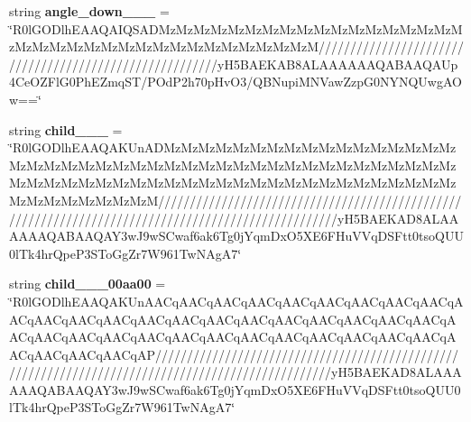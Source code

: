 \begin{DoxyCompactItemize}
\item 
\mbox{\label{class_c_utils_1_1_utils_1_1_resources_1_1_icons_a978c4593cf1b4977e728f768bfef80ed}} 
string {\bfseries angle\+\_\+down\+\_\+\_\+\_} = \char`\"{}R0l\+G\+O\+Dlh\+E\+A\+A\+Q\+A\+I\+Q\+S\+A\+D\+Mz\+Mz\+Mz\+Mz\+Mz\+Mz\+Mz\+Mz\+Mz\+Mz\+Mz\+Mz\+Mz\+Mz\+Mz\+Mz\+Mz\+Mz\+Mz\+Mz\+Mz\+Mz\+Mz\+Mz\+Mz\+Mz\+Mz\+Mz\+Mz\+Mz\+Mz\+Mz\+Mz\+Mz\+MzM////////////////////////////////////////////////////////y\+H5\+B\+A\+E\+K\+A\+B8\+A\+L\+A\+A\+A\+A\+A\+A\+Q\+A\+B\+A\+A\+Q\+A\+Up4\+Ce\+O\+Z\+Fl\+G0\+Ph\+E\+Zmq\+ST/P\+Od\+P2h70p\+Hv\+O3/Q\+B\+Nupi\+M\+N\+Vaw\+Zzp\+G0\+N\+Y\+N\+Q\+Uwg\+A\+Ow==\char`\"{}
\item 
\mbox{\label{class_c_utils_1_1_utils_1_1_resources_1_1_icons_a7312b130476c6556ab1cd6ba6aea9ccc}} 
string {\bfseries child\+\_\+\_\+\_} = \char`\"{}R0l\+G\+O\+Dlh\+E\+A\+A\+Q\+A\+K\+Un\+A\+D\+Mz\+Mz\+Mz\+Mz\+Mz\+Mz\+Mz\+Mz\+Mz\+Mz\+Mz\+Mz\+Mz\+Mz\+Mz\+Mz\+Mz\+Mz\+Mz\+Mz\+Mz\+Mz\+Mz\+Mz\+Mz\+Mz\+Mz\+Mz\+Mz\+Mz\+Mz\+Mz\+Mz\+Mz\+Mz\+Mz\+Mz\+Mz\+Mz\+Mz\+Mz\+Mz\+Mz\+Mz\+Mz\+Mz\+Mz\+Mz\+Mz\+Mz\+Mz\+Mz\+Mz\+Mz\+Mz\+Mz\+Mz\+Mz\+Mz\+Mz\+Mz\+Mz\+Mz\+Mz\+Mz\+Mz\+Mz\+Mz\+Mz\+Mz\+Mz\+Mz\+Mz\+Mz\+Mz\+Mz\+MzM////////////////////////////////////////////////////////////////////////////////////////////////////y\+H5\+B\+A\+E\+K\+A\+D8\+A\+L\+A\+A\+A\+A\+A\+A\+Q\+A\+B\+A\+A\+Q\+A\+Y3w\+J9w\+S\+Cwaf6ak6\+Tg0j\+Yqm\+Dx\+O5\+X\+E6\+F\+Hu\+V\+Vq\+D\+S\+Ftt0tso\+Q\+U\+U0l\+Tk4hr\+Qpe\+P3\+S\+To\+Gg\+Zr7\+W961\+Tw\+N\+Ag\+A7\char`\"{}
\item 
\mbox{\label{class_c_utils_1_1_utils_1_1_resources_1_1_icons_a584b8ca63e9bb1aeb48e515078a8b230}} 
string {\bfseries child\+\_\+\_\+\_\+00aa00} = \char`\"{}R0l\+G\+O\+Dlh\+E\+A\+A\+Q\+A\+K\+Un\+A\+A\+Cq\+A\+A\+Cq\+A\+A\+Cq\+A\+A\+Cq\+A\+A\+Cq\+A\+A\+Cq\+A\+A\+Cq\+A\+A\+Cq\+A\+A\+Cq\+A\+A\+Cq\+A\+A\+Cq\+A\+A\+Cq\+A\+A\+Cq\+A\+A\+Cq\+A\+A\+Cq\+A\+A\+Cq\+A\+A\+Cq\+A\+A\+Cq\+A\+A\+Cq\+A\+A\+Cq\+A\+A\+Cq\+A\+A\+Cq\+A\+A\+Cq\+A\+A\+Cq\+A\+A\+Cq\+A\+A\+Cq\+A\+A\+Cq\+A\+A\+Cq\+A\+A\+Cq\+A\+A\+Cq\+A\+A\+Cq\+A\+A\+Cq\+A\+A\+Cq\+A\+A\+Cq\+A\+A\+Cq\+A\+A\+Cq\+A\+A\+Cq\+A\+A\+Cq\+A\+A\+Cq\+AP///////////////////////////////////////////////////////////////////////////////////////////////////y\+H5\+B\+A\+E\+K\+A\+D8\+A\+L\+A\+A\+A\+A\+A\+A\+Q\+A\+B\+A\+A\+Q\+A\+Y3w\+J9w\+S\+Cwaf6ak6\+Tg0j\+Yqm\+Dx\+O5\+X\+E6\+F\+Hu\+V\+Vq\+D\+S\+Ftt0tso\+Q\+U\+U0l\+Tk4hr\+Qpe\+P3\+S\+To\+Gg\+Zr7\+W961\+Tw\+N\+Ag\+A7\char`\"{}

\end{DoxyCompactItemize}
